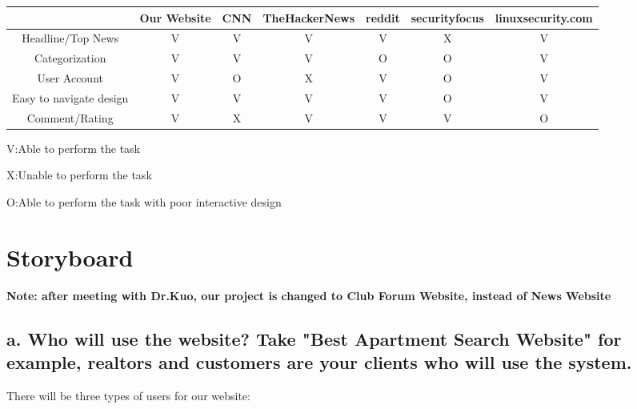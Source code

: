\documentclass{article}
\begin{document}
\begin{table}[h!]
    \hskip-2.5cm\begin{tabular}{|c|c|c|c|c|c|c|}
    \hline
                   &  Our Website & CNN & TheHackerNews & reddit & securityfocus & linuxsecurity.com\\
    \hline
    Headline/Top News    &     V       &    V   &   V    &   V    &   X    &     V         \\
    \hline
    Categorization    &      V      &   V    &   V    &   O    &    O   &       V       \\
    \hline
    User Account    &     V      &   O    &    X   &   V    &    O   &      V       \\
    \hline
    Easy to navigate design    &      V      &   V    &   V    &  V     &   O    &    V          \\
    \hline
    Comment/Rating    &     V       &   X    &   V    &   V    &    V   &      O        \\ 
    \hline
    \end{tabular}
\end{table}
V:Able to perform the task\par
X:Unable to perform the task\par
O:Able to perform the task with poor interactive design\par



\section{Storyboard}

\textbf{Note: after meeting with Dr.Kuo, our project is changed to Club Forum Website, instead of News Website}

\subsection{a. Who will use the website? Take "Best Apartment Search Website" for example, realtors and customers are your clients who will use the system.}

There will be three types of users for our website:
\end{document}
